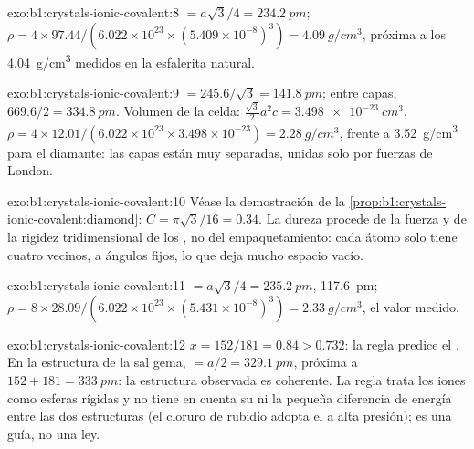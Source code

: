 \begin{solution}{exo:b1:crystals-ionic-covalent:8}
 $= a\sqrt3/4 = \qty{234.2}{pm}$;
$\rho = 4 \times 97.44/(6.022 \times 10^{23} \times (5.409 \times
10^{-8})^3) = \qty{4.09}{g/cm^3}$, próxima a los \qty{4.04}{g/cm^3}
medidos en la esfalerita natural.
\end{solution}

\begin{solution}{exo:b1:crystals-ionic-covalent:9}
 $= 245.6/\sqrt3 = \qty{141.8}{pm}$; entre capas, $669.6/2 =
\qty{334.8}{pm}$. Volumen de la celda: $\frac{\sqrt3}{2}a^2c = \qty{3.498e-23}{cm^3}$,
$\rho = 4 \times 12.01/(6.022 \times 10^{23} \times 3.498 \times 10^{-23})
= \qty{2.28}{g/cm^3}$, frente a \qty{3.52}{g/cm^3} para el diamante: las
capas están muy separadas, unidas solo por fuerzas de London.
\end{solution}

\begin{solution}{exo:b1:crystals-ionic-covalent:10}
Véase la demostración de la \cref{prop:b1:crystals-ionic-covalent:diamond}:
$C = \pi\sqrt3/16 = 0.34$. La dureza procede de la fuerza y de la rigidez
tridimensional de los , no del empaquetamiento: cada
átomo solo tiene cuatro vecinos, a ángulos fijos, lo que deja mucho
espacio vacío.
\end{solution}

\begin{solution}{exo:b1:crystals-ionic-covalent:11}
 $= a\sqrt3/4 = \qty{235.2}{pm}$, 
\qty{117.6}{pm}; $\rho = 8 \times 28.09/(6.022 \times 10^{23} \times
(5.431 \times 10^{-8})^3) = \qty{2.33}{g/cm^3}$, el valor medido.
\end{solution}

\begin{solution}{exo:b1:crystals-ionic-covalent:12}
$x = 152/181 = 0.84 > 0.732$: la regla predice el .
En la estructura de la sal gema,  $= a/2 = \qty{329.1}{pm}$,
próxima a $152 + 181 = \qty{333}{pm}$: la estructura observada es
coherente. La regla trata los iones como esferas rígidas y no tiene en
cuenta su  ni la pequeña diferencia de energía entre las
dos estructuras (el cloruro de rubidio adopta el  a
alta presión); es una guía, no una ley.
\end{solution}

